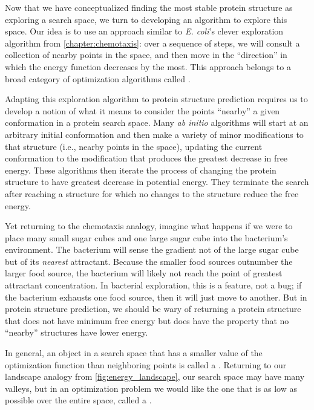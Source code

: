 Now that we have conceptualized finding the most stable protein structure as exploring a search space, we turn to developing an algorithm to explore this space. Our idea is to use an approach similar to \textit{E. coli}'s clever exploration algorithm from \autoref{chapter:chemotaxis}: over a sequence of steps, we will consult a collection of nearby points in the space, and then move in the ``direction'' in which the energy function decreases by the most. This approach belongs to a broad category of optimization algorithms called .

Adapting this exploration algorithm to protein structure prediction requires us to develop a notion of what it means to consider the points ``nearby'' a given conformation in a protein search space. Many \textit{ab initio} algorithms will start at an arbitrary initial conformation and then make a variety of minor modifications to that structure (i.e., nearby points in the space), updating the current conformation to the modification that produces the greatest decrease in free energy. These algorithms then iterate the process of changing the protein structure to have greatest decrease in potential energy. They terminate the search after reaching a structure for which no changes to the structure reduce the free energy.

Yet returning to the chemotaxis analogy, imagine what happens if we were to place many small sugar cubes and one large sugar cube into the bacterium's environment. The bacterium will sense the gradient not of the large sugar cube but of its \textit{nearest} attractant. Because the smaller food sources outnumber the larger food source, the bacterium will likely not reach the point of greatest attractant concentration. In bacterial exploration, this is a feature, not a bug; if the bacterium exhausts one food source, then it will just move to another. But in protein structure prediction, we should be wary of returning a protein structure that does not have minimum free energy but does have the property that no ``nearby'' structures have lower energy.

In general, an object in a search space that has a smaller value of the optimization function than neighboring points is called a . Returning to our landscape analogy from \autoref{fig:energy_landscape}, our search space may have many valleys, but in an optimization problem we would like the one that is as low as possible over the entire space, called a .\\

